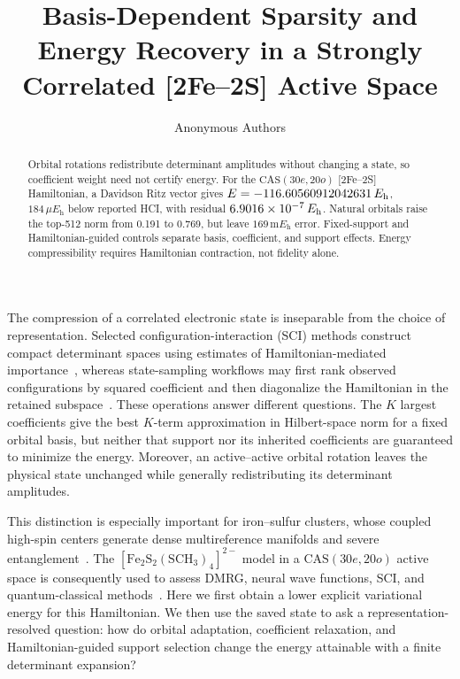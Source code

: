 \documentclass[
  aps,
  reprint,
  superscriptaddress,
  nofootinbib,
  longbibliography,
  floatfix
]{revtex4-2}
\newcommand{\Eh}{E_{\mathrm h}}
\newcommand{\cas}{\mathrm{CAS}(30e,20o)}
\begin{document}
\title{Basis-Dependent Sparsity and Energy Recovery in a Strongly Correlated [2Fe--2S] Active Space}

\author{Anonymous Authors}

\begin{abstract}
Orbital rotations redistribute determinant amplitudes without changing a state, so
coefficient weight need not certify energy.  For the \(\cas\) [2Fe--2S]
Hamiltonian, a Davidson Ritz vector gives \(E=\FinalEnergy\,\Eh\),
\(184\,\mu\Eh\) below reported HCI, with residual
\(\FinalResidual\,\Eh\).  Natural orbitals raise the top-512 norm from 0.191
to 0.769, but leave \(169\,\mathrm{m}\Eh\) error.  Fixed-support and
Hamiltonian-guided controls separate basis, coefficient, and support effects.
Energy compressibility requires Hamiltonian contraction, not fidelity alone.
\end{abstract}

\maketitle

The compression of a correlated electronic state is inseparable from the
choice of representation.  Selected configuration-interaction (SCI) methods
construct compact determinant spaces using estimates of Hamiltonian-mediated
importance~\cite{holmes2016,sharma2017,zhang2025}, whereas state-sampling
workflows may first rank observed configurations by squared coefficient and
then diagonalize the Hamiltonian in the retained subspace~\cite{yoo2026}.
These operations answer different questions.  The \(K\) largest coefficients
give the best \(K\)-term approximation in Hilbert-space norm for a fixed
orbital basis, but neither that support nor its inherited coefficients are
guaranteed to minimize the energy.  Moreover, an active--active orbital
rotation leaves the physical state unchanged while generally redistributing
its determinant amplitudes.

This distinction is especially important for iron--sulfur clusters, whose
coupled high-spin centers generate dense multireference manifolds and severe
entanglement~\cite{sharma2014,li2017}.  The
\([\mathrm{Fe}_2\mathrm{S}_2(\mathrm{SCH}_3)_4]^{2-}\) model in a
\(\cas\) active space is consequently used to assess DMRG, neural
wave functions, SCI, and quantum-classical methods~\cite{li2017,ma2025,yoo2026}.
Here we first obtain a lower explicit variational energy for this Hamiltonian.
We then use the saved state to ask a representation-resolved question: how do
orbital adaptation, coefficient relaxation, and Hamiltonian-guided support
selection change the energy attainable with a finite determinant expansion?
\end{document}
